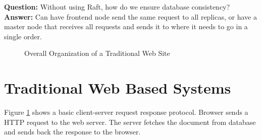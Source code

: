 \documentclass[twoside]{article}
\begin{document}
\textbf{Question:} Without using Raft, how do we ensure database consistency?\\
\textbf{Answer:} Can have frontend node send the same request to all replicas, or have a master node that receives all requests and sends it to where it needs to go in a single order.\\
\begin{figure}[h]
\begin{center}
\caption{Overall Organization of a Traditional Web Site}
\label{traditional_web_based}
\end{center}
\end{figure}
\section{Traditional Web Based Systems}
Figure \ref{traditional_web_based} shows a basic client-server request response protocol. Browser sends a HTTP request to the web server. The server fetches the document from database and sends back the response to the browser.
\end{document}
